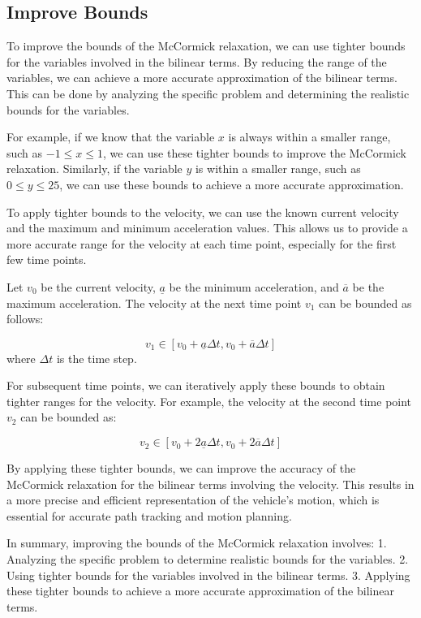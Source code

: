\subsection{Improve Bounds}

To improve the bounds of the McCormick relaxation, we can use tighter bounds for the variables involved in the bilinear terms.
By reducing the range of the variables, we can achieve a more accurate approximation of the bilinear terms.
This can be done by analyzing the specific problem and determining the realistic bounds for the variables.

For example, if we know that the variable \( x \) is always within a smaller range, such as \( -1 \leq x \leq 1 \), we can use these tighter bounds
to improve the McCormick relaxation.
Similarly, if the variable \( y \) is within a smaller range, such as \( 0 \leq y \leq 25 \), we can use these bounds to achieve a more accurate
approximation.

To apply tighter bounds to the velocity, we can use the known current velocity and the maximum and minimum acceleration values.
This allows us to provide a more accurate range for the velocity at each time point, especially for the first few time points.

Let \( v_0 \) be the current velocity, \( \underline{a} \) be the minimum acceleration, and \( \overline{a} \) be the maximum acceleration.
The velocity at the next time point \( v_1 \) can be bounded as follows:

\[ v_1 \in [v_0 + \underline{a} \Delta t, v_0 +
		\overline{a} \Delta t] \] where \( \Delta t \) is the time step.

For subsequent time points, we can iteratively apply these bounds to obtain tighter ranges for the velocity.
For example, the velocity at the second time point \( v_2 \) can be bounded as:

\[ v_2 \in [v_0 + 2\underline{a} \Delta t, v_0 +
		2\overline{a} \Delta t] \]

By applying these tighter bounds, we can improve the accuracy of the McCormick relaxation for the
bilinear terms involving the velocity.
This results in a more precise and efficient representation of the vehicle's motion, which is essential for accurate path tracking and motion
planning.

In summary, improving the bounds of the McCormick relaxation involves: 1.
Analyzing the specific problem to determine realistic bounds for the variables.
2.
Using tighter bounds for the variables involved in the bilinear terms.
3.
Applying these tighter bounds to achieve a more accurate approximation of the bilinear terms.

